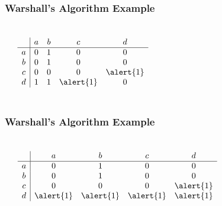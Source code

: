 \documentclass[dvipsnames]{beamer}
\begin{document}
\begin{frame}
  \frametitle{Warshall's Algorithm Example}

  \begin{example}
    \begin{columns}
      \begin{center}
      \end{center}

      \[
        \begin{array}{c|cccc}
              & a & b & c & d\\\hline
            a & 0 & 1 & 0 & 0\\
            b & 0 & 1 & 0 & 0\\
            c & 0 & 0 & 0 & \alert{1}\\
            d & 1 & 1 & \alert{1} & 0
        \end{array}
      \]
    \end{columns}
  \end{example}
\end{frame}

\begin{frame}
  \frametitle{Warshall's Algorithm Example}

  \begin{example}
    \begin{columns}
      \begin{center}
      \end{center}

      \[
        \begin{array}{c|cccc}
              & a & b & c & d\\\hline
            a & 0 & 1 & 0 & 0\\
            b & 0 & 1 & 0 & 0\\
            c & 0 & 0 & 0 & \alert{1}\\
            d & \alert{1} & \alert{1} & \alert{1} & \alert{1}
        \end{array}
      \]
    \end{columns}
  \end{example}
\end{frame}
\end{document}
